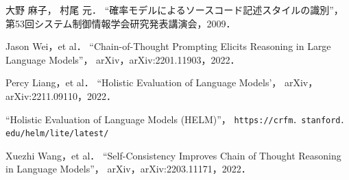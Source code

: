 \documentclass[twocolumn]{jarticle}
\begin{document}
\begin{thebibliography}{9}
 \renewcommand{\baselinestretch}{1.0}
 \small

	大野 麻子， 村尾 元．
 	``確率モデルによるソースコード記述スタイルの識別''，
	 第53回システム制御情報学会研究発表講演会，2009．

   Jason Wei，et al．
	 ``Chain-of-Thought Prompting Elicits Reasoning in Large Language Models''，
	 arXiv，arXiv:2201.11903，2022．

  Percy Liang，et al．
	 ``Holistic Evaluation of Language Models'，
	 arXiv，arXiv:2211.09110，2022． 

	 ``Holistic Evaluation of Language Models (HELM)''，
	 \verb|https://crfm．stanford．edu/helm/lite/latest/|

	 Xuezhi Wang，et al．
	 ``Self-Consistency Improves Chain of Thought Reasoning in Language Models''，
	 arXiv，arXiv:2203.11171，2022．

\end{thebibliography}
\end{document}

